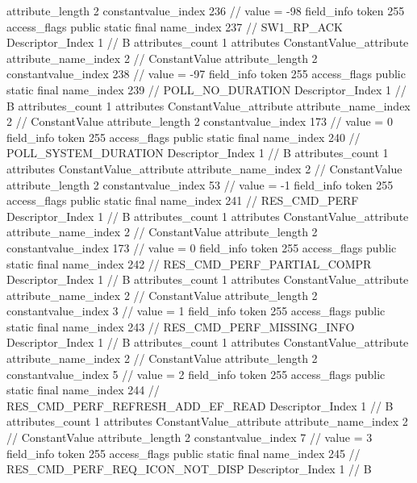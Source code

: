 {{{{{{{					attribute_length	2
					constantvalue_index	236		// value = -98
				}
				}
			}
			field_info {
				token	255
				access_flags	public static final
				name_index	237		// SW1_RP_ACK
				Descriptor_Index	1		// B
				attributes_count	1
				attributes {
				ConstantValue_attribute {
					attribute_name_index	2		// ConstantValue
					attribute_length	2
					constantvalue_index	238		// value = -97
				}
				}
			}
			field_info {
				token	255
				access_flags	public static final
				name_index	239		// POLL_NO_DURATION
				Descriptor_Index	1		// B
				attributes_count	1
				attributes {
				ConstantValue_attribute {
					attribute_name_index	2		// ConstantValue
					attribute_length	2
					constantvalue_index	173		// value = 0
				}
				}
			}
			field_info {
				token	255
				access_flags	public static final
				name_index	240		// POLL_SYSTEM_DURATION
				Descriptor_Index	1		// B
				attributes_count	1
				attributes {
				ConstantValue_attribute {
					attribute_name_index	2		// ConstantValue
					attribute_length	2
					constantvalue_index	53		// value = -1
				}
				}
			}
			field_info {
				token	255
				access_flags	public static final
				name_index	241		// RES_CMD_PERF
				Descriptor_Index	1		// B
				attributes_count	1
				attributes {
				ConstantValue_attribute {
					attribute_name_index	2		// ConstantValue
					attribute_length	2
					constantvalue_index	173		// value = 0
				}
				}
			}
			field_info {
				token	255
				access_flags	public static final
				name_index	242		// RES_CMD_PERF_PARTIAL_COMPR
				Descriptor_Index	1		// B
				attributes_count	1
				attributes {
				ConstantValue_attribute {
					attribute_name_index	2		// ConstantValue
					attribute_length	2
					constantvalue_index	3		// value = 1
				}
				}
			}
			field_info {
				token	255
				access_flags	public static final
				name_index	243		// RES_CMD_PERF_MISSING_INFO
				Descriptor_Index	1		// B
				attributes_count	1
				attributes {
				ConstantValue_attribute {
					attribute_name_index	2		// ConstantValue
					attribute_length	2
					constantvalue_index	5		// value = 2
				}
				}
			}
			field_info {
				token	255
				access_flags	public static final
				name_index	244		// RES_CMD_PERF_REFRESH_ADD_EF_READ
				Descriptor_Index	1		// B
				attributes_count	1
				attributes {
				ConstantValue_attribute {
					attribute_name_index	2		// ConstantValue
					attribute_length	2
					constantvalue_index	7		// value = 3
				}
				}
			}
			field_info {
				token	255
				access_flags	public static final
				name_index	245		// RES_CMD_PERF_REQ_ICON_NOT_DISP
				Descriptor_Index	1		// B
}}}}}

